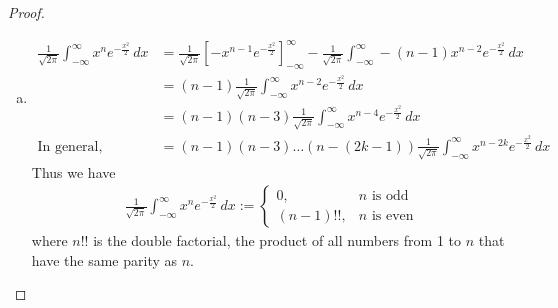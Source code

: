 \documentclass[a4paper,12pt]{article}
\theoremstyle{definition}
\begin{document}
\begin{proof}
\begin{enumerate}[(a)]
\item
\begin{align*}
\frac{1}{\sqrt{2\pi}}\int_{-\infty}^{\infty}x^ne^{-\frac{x^2}{2}}\,dx&=\frac{1}{\sqrt{2\pi}}\left[-x^{n-1}e^{-\frac{x^2}{2}}\right]_{-\infty}^{\infty}-\frac{1}{\sqrt{2\pi}}\int_{-\infty}^{\infty}-(n-1)x^{n-2}e^{-\frac{x^2}{2}}\,dx\\
&=(n-1)\frac{1}{\sqrt{2\pi}}\int_{-\infty}^{\infty}x^{n-2}e^{-\frac{x^2}{2}}\,dx\\
&=(n-1)(n-3)\frac{1}{\sqrt{2\pi}}\int_{-\infty}^{\infty}x^{n-4}e^{-\frac{x^2}{2}}\,dx\\
\text{In general, } &=(n-1)(n-3)\ldots(n-(2k-1))\frac{1}{\sqrt{2\pi}}\int_{-\infty}^{\infty}x^{n-2k}e^{-\frac{x^2}{2}}\,dx
\end{align*}
Thus we have
\begin{align*}
\frac{1}{\sqrt{2\pi}}\int_{-\infty}^{\infty}x^ne^{-\frac{x^2}{2}}\,dx :=\begin{cases}
0, & \text{$n$ is odd}\\
(n-1)!! , & \text{$n$ is even}
\end{cases}
\end{align*}
where $n!!$ is the double factorial, the product of all numbers from 1 to $n$ that have the same parity as $n$.





\end{enumerate}

\end{proof}
\end{document}
